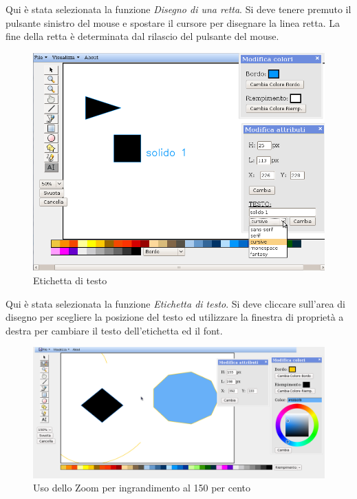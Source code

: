 \vspace{100pt}
Qui \`e stata selezionata la funzione \textit{Disegno di una retta}. Si deve tenere premuto il pulsante sinistro del mouse e spostare il cursore per disegnare la linea retta. La fine della retta \`e determinata dal rilascio del pulsante del mouse.
\newpage


\begin{figure}[!ht]
\centering
\includegraphics[scale=0.5]{images/label.png}
\caption{Etichetta di testo}
\end{figure} 


\vspace{100pt}
Qui \`e stata selezionata la funzione \textit{Etichetta di testo}. Si deve cliccare sull'area di disegno per scegliere la posizione del testo ed utilizzare la finestra di propriet\`a a destra per cambiare il testo dell'etichetta ed il font.
\newpage
 
\begin{figure}[!ht]
\centering
\includegraphics[scale=0.4]{images/zoom_piu.png}
\caption{Uso dello Zoom per ingrandimento al 150 per cento}
\end{figure} 

